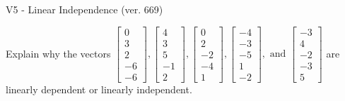 \begin{exercise}
  \begin{exerciseTitle}V5 - Linear Independence (ver. 669)\end{exerciseTitle}
  \begin{exerciseStatement}
    Explain why the vectors \(\left[\begin{array}{r}
0 \\
3 \\
2 \\
-6 \\
-6
\end{array}\right] , \left[\begin{array}{r}
4 \\
3 \\
5 \\
-1 \\
2
\end{array}\right] , \left[\begin{array}{r}
0 \\
2 \\
-2 \\
-4 \\
1
\end{array}\right] , \left[\begin{array}{r}
-4 \\
-3 \\
-5 \\
1 \\
-2
\end{array}\right] , \text{ and } \left[\begin{array}{r}
-3 \\
4 \\
-2 \\
-3 \\
5
\end{array}\right]\) are linearly dependent or linearly independent.	



\end{exerciseStatement}
\end{exercise}

